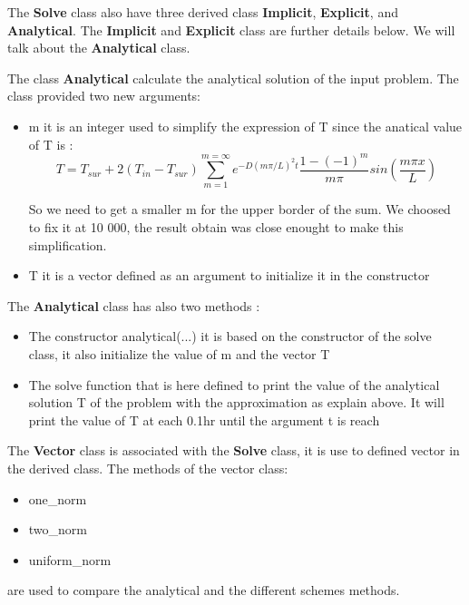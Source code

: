 \documentclass [10 pt, a4 paper]{article}
\begin{document}
\vspace{0.3cm}
The \textbf{Solve} class also have three derived class \textbf{Implicit}, \textbf{Explicit}, and \textbf{Analytical}.
The \textbf{Implicit} and \textbf{Explicit} class are further details below. We will talk about the \textbf{Analytical} class.
\vspace{0.3cm}

The class \textbf{Analytical} calculate the analytical solution of the input problem.
The class provided two new arguments:
\begin{itemize}
    \item m it is an integer used to simplify the expression of T since the anatical value of T is : 
    \begin{equation}
        T = T_{sur} + 2(T_{in}-T_{sur}) \sum_{m=1}^{m=\infty} e^{-D(m\pi /L)^{2}t} \frac{1-(-1)^{m}}{m\pi} sin(\frac{m\pi x}{L})
    \end{equation}

    So we need to get a smaller m for the upper border of the sum. We choosed to fix it at 10 000, 
    the result obtain was close enought to make this simplification.

    \item T it is a vector defined as an argument to initialize it in the constructor
\end{itemize}
The \textbf{Analytical} class has also two methods :
\begin{itemize}
    \item The constructor analytical(...) it is based on the constructor of the solve class, it also
    initialize the value of m and the vector T
    \item The solve function that is here defined to print the value of the analytical solution T 
    of the problem with the approximation as explain above. It will print the value of T at each 0.1hr
    until the argument t is reach
\end{itemize}

\vspace{0.3cm}

The \textbf{Vector} class is associated with the \textbf{Solve} class, it is use to defined 
vector in the derived class.
The methods of the vector class:
\begin{itemize}
    \item one\_norm
    \item two\_norm
    \item uniform\_norm
\end{itemize}
are used to compare the analytical and the different schemes methods.
\end{document}

